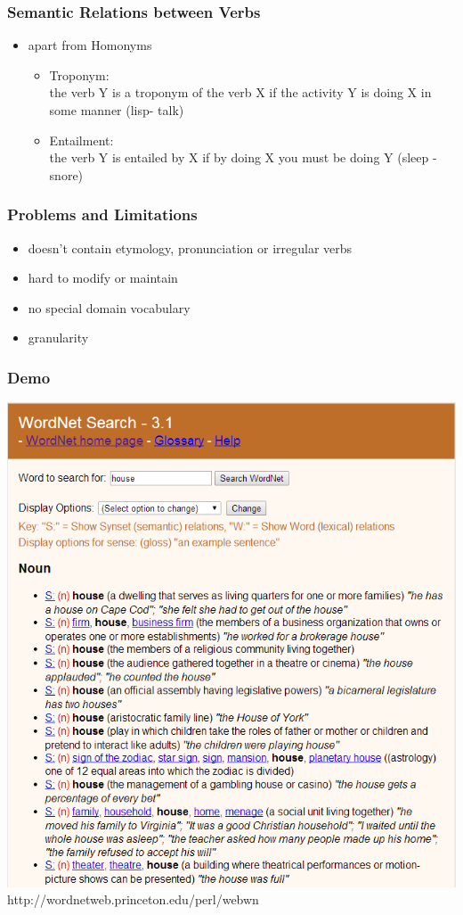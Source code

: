 \begin{frame}
\frametitle{Semantic Relations between Verbs}
\begin{itemize}
\item apart from Homonyms
\begin{itemize}
\item Troponym:\\
the verb Y is a troponym of the verb X if the activity Y is doing X in some manner (lisp- talk)
\item Entailment:\\
the verb Y is entailed by X if by doing X you must be doing Y (sleep - snore)
\end{itemize}
\end{itemize}
\end{frame}

\begin{frame}
\frametitle{Problems and Limitations}
\begin{itemize}
\item doesn't contain etymology, pronunciation or irregular verbs
\item hard to modify or maintain
\item no special domain vocabulary
\item granularity
\end{itemize}
\end{frame}


\begin{frame}
\frametitle{Demo}
\includegraphics[scale=0.29]{img/wordnet_demo.png}\\
http://wordnetweb.princeton.edu/perl/webwn
\end{frame}

